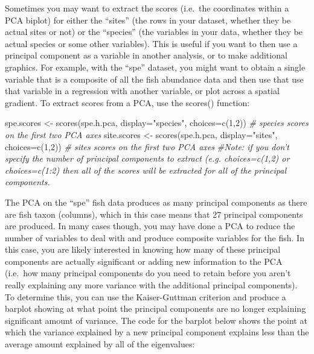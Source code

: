 \documentclass[
]{book}
\newenvironment{Shaded}{\begin{snugshade}}{\end{snugshade}}
\newcommand{\AttributeTok}[1]{\textcolor[rgb]{0.77,0.63,0.00}{#1}}
\newcommand{\CommentTok}[1]{\textcolor[rgb]{0.56,0.35,0.01}{\textit{#1}}}
\newcommand{\DecValTok}[1]{\textcolor[rgb]{0.00,0.00,0.81}{#1}}
\newcommand{\FunctionTok}[1]{\textcolor[rgb]{0.00,0.00,0.00}{#1}}
\newcommand{\NormalTok}[1]{#1}
\newcommand{\OtherTok}[1]{\textcolor[rgb]{0.56,0.35,0.01}{#1}}
\newcommand{\StringTok}[1]{\textcolor[rgb]{0.31,0.60,0.02}{#1}}
\begin{document}
Sometimes you may want to extract the scores (i.e.~the coordinates
within a PCA biplot) for either the ``sites'' (the rows in your dataset,
whether they be actual sites or not) or the ``species'' (the variables in
your data, whether they be actual species or some other variables). This
is useful if you want to then use a principal component as a variable in
another analysis, or to make additional graphics. For example, with the
``spe'' dataset, you might want to obtain a single variable that is a
composite of all the fish abundance data and then use that use that
variable in a regression with another variable, or plot across a spatial
gradient. To extract scores from a PCA, use the scores() function:

\begin{Shaded}
\begin{Highlighting}[]
\NormalTok{spe.scores }\OtherTok{\textless{}{-}} \FunctionTok{scores}\NormalTok{(spe.h.pca, }\AttributeTok{display=}\StringTok{"species"}\NormalTok{, }\AttributeTok{choices=}\FunctionTok{c}\NormalTok{(}\DecValTok{1}\NormalTok{,}\DecValTok{2}\NormalTok{)) }\CommentTok{\# species scores on the first two PCA axes}
\NormalTok{site.scores }\OtherTok{\textless{}{-}} \FunctionTok{scores}\NormalTok{(spe.h.pca, }\AttributeTok{display=}\StringTok{"sites"}\NormalTok{, }\AttributeTok{choices=}\FunctionTok{c}\NormalTok{(}\DecValTok{1}\NormalTok{,}\DecValTok{2}\NormalTok{)) }\CommentTok{\# sites scores on the first two PCA axes}
\CommentTok{\#Note: if you don’t specify the number of principal components to extract (e.g. choices=c(1,2) or choices=c(1:2) then all of the scores will be extracted for all of the principal components. }
\end{Highlighting}
\end{Shaded}

The PCA on the ``spe'' fish data produces as many principal components as
there are fish taxon (columns), which in this case means that 27
principal components are produced. In many cases though, you may have
done a PCA to reduce the number of variables to deal with and produce
composite variables for the fish. In this case, you are likely
interested in knowing how many of these principal components are
actually significant or adding new information to the PCA (i.e.~how many
principal components do you need to retain before you aren't really
explaining any more variance with the additional principal components).
To determine this, you can use the Kaiser-Guttman criterion and produce
a barplot showing at what point the principal components are no longer
explaining significant amount of variance. The code for the barplot
below shows the point at which the variance explained by a new principal
component explains less than the average amount explained by all of the
eigenvalues:
\end{document}

